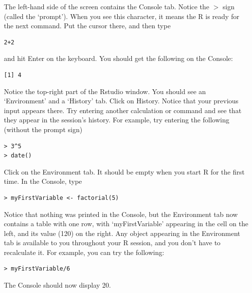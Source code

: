 \documentclass[11pt]{article}
\theoremstyle{definition}
\begin{document}
The left-hand side of the screen contains the Console tab. Notice the $>$ sign (called the `prompt'). When you see this character, it means the R is ready for the next command. Put the cursor there, and then type\\
\begin{tcolorbox}[colback=gray!20,boxrule=0pt,frame hidden]
\begin{verbatim}
2+2
\end{verbatim}
\end{tcolorbox}
and hit Enter on the keyboard. You should get the following on the Console:
\begin{tcolorbox}[colback=gray!20,boxrule=0pt,frame hidden]
\begin{verbatim}
[1] 4
\end{verbatim}
\end{tcolorbox}

Notice the top-right part of the Rstudio window. You should see an `Environment' and a `History' tab. Click on History. Notice that your previous input appears there. Try entering another calculation or command and see that they appear in the session's history. For example, try entering the following (without the prompt sign)
 \begin{tcolorbox}[colback=gray!20,boxrule=0pt,frame hidden]
\begin{verbatim}
> 3^5
> date()
\end{verbatim}
\end{tcolorbox}

Click on the Environment tab. It should be empty when you start R for the first time. In the Console, type
\begin{tcolorbox}[colback=gray!20,boxrule=0pt,frame hidden]
\begin{verbatim}
> myFirstVariable <- factorial(5)
\end{verbatim}
\end{tcolorbox}
Notice that nothing was printed in the Console, but the Environment tab now contains a table with one row, with `myFirstVariable' appearing in the cell on the left, and its value (120) on the right. Any object appearing in the Environment tab is available to you throughout your R session, and you don't have to recalculate it. For example, you can try the following:
\begin{tcolorbox}[colback=gray!20,boxrule=0pt,frame hidden]
\begin{verbatim}
> myFirstVariable/6
\end{verbatim}
\end{tcolorbox}
The Console should now display 20.
\end{document}
